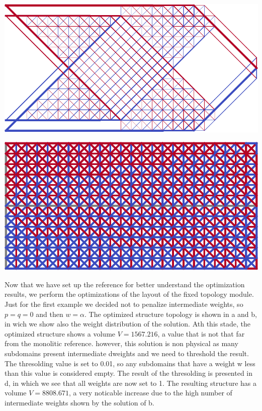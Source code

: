 \begin{marginfigure}
    \centering
    \includegraphics[width=\linewidth]{figures/06_DMO/00_cantilever_extremes/mono.pdf}
    \caption{$V=832.848$}
    \label{fig:06_cant_mono}
\end{marginfigure}


\begin{marginfigure}
    \centering
    \includegraphics[width=\linewidth]{figures/06_DMO/00_cantilever_extremes/cell.pdf}
    \caption{$V=9832.935$}
    \label{fig:06_cant_BC_cell}
\end{marginfigure}

Now that we have set up the reference for better understand the optimization results, we perform the optimizations of the layout of the fixed topology module. Just for the first example we decided not to penalize intermediate weights, so $p=q=0$ and then $w=\alpha$. The optimized structure topology is shown in a and b, in wich we show also the weight distribution of the solution. Ath this stade, the optimized structure shows a volume $V = 1567.216$, a value that is not that far from the monolitic reference. however, this solution is non physical as many subdomains present intermediate dweights and we need to threshold the result. The thresolding value is set to 0.01, so any subdomains that have a weight w less than this value is considered empty. The result of the thresolding is presented in d, in which we see that all weights are now set to 1. The resulting structure has a volume $V = 8808.671$, a very noticable increase due to the high number of intermediate weights shown by the solution of b.

